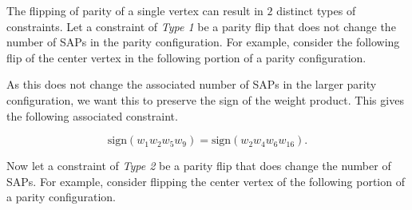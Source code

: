 \documentclass[12pt]{article}
\theoremstyle{plain}
\theoremstyle{definition}
\theoremstyle{remark}
\theoremstyle{definition}
\newcommand{\cell}[4]{ \draw[thick] ( #1 , #2 ) rectangle ( #3 , #4 );}
\newcommand{\lablnode}[3]{\node[shape=circle,draw=none,fill=none, inner sep=0pt,minimum size=0pt] (A) at ( #1 , #2 ) {#3};}
\begin{document}
The flipping of parity of a single vertex can result in $2$ distinct types of constraints. Let a constraint of \textit{Type 1} be a parity flip that does not change the number of SAPs in the parity configuration. For example, consider the following flip of the center vertex in the following portion of a parity configuration.

\begin{center}
\end{center}

As this does not change the associated number of SAPs in the larger parity configuration, we want this to preserve the sign of the weight product. This gives the following associated constraint. 

$$\text{sign}(w_{1}w_{2}w_{5}w_{9}) = \text{sign}(w_{2}w_{4}w_{6}w_{16}).$$

Now let a constraint of \textit{Type 2} be a parity flip that does change the number of SAPs. For example, consider flipping the center vertex of the following portion of a parity configuration.
\end{document}
